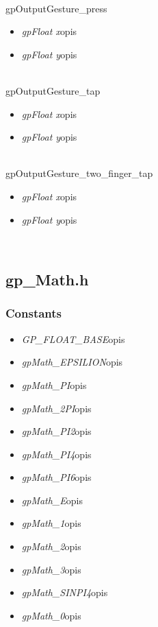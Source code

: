 \ \\
\textsf{gpOutputGesture_press}
	\begin{itemize}
		\item \textit{gpFloat x}\quad opis
		\item \textit{gpFloat y}\quad opis
	\end{itemize}
\ \\
\textsf{gpOutputGesture_tap}
	\begin{itemize}
		\item \textit{gpFloat x}\quad opis
		\item \textit{gpFloat y}\quad opis
	\end{itemize}
\ \\
\textsf{gpOutputGesture_two_finger_tap}
	\begin{itemize}
		\item \textit{gpFloat x}\quad opis
		\item \textit{gpFloat y}\quad opis
	\end{itemize}
\ \\

\subsection{gp_Math.h}
\subsubsection{Constants}
\begin{itemize}
\item \textit{GP_FLOAT_BASE}\qquad opis
\item \textit{gpMath_EPSILION}\qquad opis
\item \textit{gpMath_PI}\qquad opis
\item \textit{gpMath_2PI}\qquad opis
\item \textit{gpMath_PI2}\qquad opis
\item \textit{gpMath_PI4}\qquad opis
\item \textit{gpMath_PI6}\qquad opis
\item \textit{gpMath_E}\qquad opis
\item \textit{gpMath_1}\qquad opis
\item \textit{gpMath_2}\qquad opis
\item \textit{gpMath_3}\qquad opis
\item \textit{gpMath_SINPI4}\qquad opis
\item \textit{gpMath_0}\qquad opis
\end{itemize}
